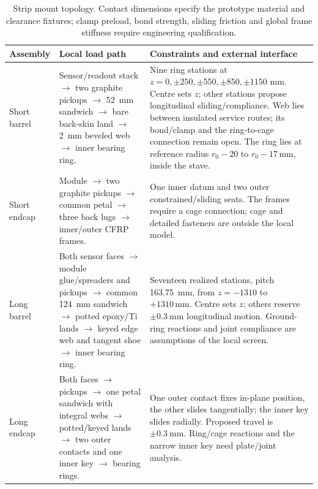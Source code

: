 \begin{table}[!htbp]
\caption{Strip mount topology. Contact dimensions specify the prototype
material and clearance fixtures; clamp preload, bond strength, sliding friction
and global frame stiffness require engineering qualification.}
\label{tab:strip-mounting-interfaces}
\centering\small
\begin{tabular}{@{}>{\raggedright\arraybackslash}p{.17\linewidth}>{\raggedright\arraybackslash}p{.42\linewidth}>{\raggedright\arraybackslash}p{.34\linewidth}@{}}
\toprule Assembly & Local load path & Constraints and external interface\\\midrule
Short barrel & Sensor/readout stack $\to$ two graphite pickups $\to$
\qty{52}{\milli\metre} sandwich $\to$ bare back-skin land $\to$
\qty{2}{\milli\metre} beveled web $\to$ inner bearing ring.
& Nine ring stations at $z=0,\pm250,\pm550,\pm850,\pm1150$
\unit{\milli\metre}. Centre sets $z$; other stations propose longitudinal
sliding/compliance. Web lies between insulated service routes; its bond/clamp
and the ring-to-cage connection remain open. The ring lies at reference radius
$r_0-20$ to $r_0-17\,\unit{\milli\metre}$, inside the stave.\\
Short endcap & Module $\to$ two graphite pickups $\to$ common petal
$\to$ three back lugs $\to$ inner/outer CFRP frames.
& One inner datum and two outer constrained/sliding seats. The frames require
a cage connection; cage and detailed fasteners are outside the local model.\\
Long barrel & Both sensor faces $\to$ module glue/spreaders and pickups
$\to$ common \qty{124}{\milli\metre} sandwich $\to$ potted epoxy/Ti
lands $\to$ keyed edge web and tangent shoe $\to$ inner bearing ring.
& Seventeen realized stations, pitch \qty{163.75}{\milli\metre}, from
$z=-1310$ to $+1310\,\unit{\milli\metre}$. Centre sets $z$; others
reserve $\pm\qty{0.3}{\milli\metre}$ longitudinal motion. Ground-ring
reactions and joint compliance are assumptions of the local screen.\\
Long endcap & Both faces $\to$ pickups $\to$ one petal sandwich with integral
webs $\to$ potted/keyed lands $\to$ two outer contacts and one inner key
$\to$ bearing rings.
& One outer contact fixes in-plane position, the other slides tangentially;
the inner key slides radially. Proposed travel is
$\pm\qty{0.3}{\milli\metre}$. Ring/cage reactions and the narrow inner key
need plate/joint analysis.\\\bottomrule
\end{tabular}
\end{table}

